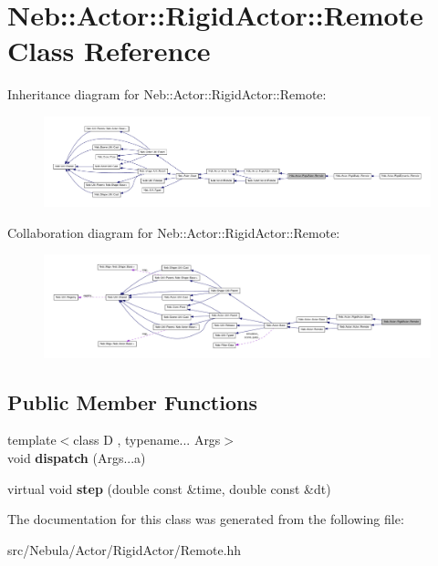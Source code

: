 \hypertarget{classNeb_1_1Actor_1_1RigidActor_1_1Remote}{\section{\-Neb\-:\-:\-Actor\-:\-:\-Rigid\-Actor\-:\-:\-Remote \-Class \-Reference}
\label{classNeb_1_1Actor_1_1RigidActor_1_1Remote}
}


\-Inheritance diagram for \-Neb\-:\-:\-Actor\-:\-:\-Rigid\-Actor\-:\-:\-Remote\-:\nopagebreak
\begin{figure}[H]
\begin{center}
\leavevmode
\includegraphics[width=350pt]{classNeb_1_1Actor_1_1RigidActor_1_1Remote__inherit__graph}
\end{center}
\end{figure}


\-Collaboration diagram for \-Neb\-:\-:\-Actor\-:\-:\-Rigid\-Actor\-:\-:\-Remote\-:\nopagebreak
\begin{figure}[H]
\begin{center}
\leavevmode
\includegraphics[width=350pt]{classNeb_1_1Actor_1_1RigidActor_1_1Remote__coll__graph}
\end{center}
\end{figure}
\subsection*{\-Public \-Member \-Functions}
\begin{DoxyCompactItemize}
\item 
\hypertarget{classNeb_1_1Actor_1_1RigidActor_1_1Remote_a2812d40eec201faec0a16b89bd4e64e3}{{\footnotesize template$<$class D , typename... \-Args$>$ }\\void {\bfseries dispatch} (\-Args...\-a)}\label{classNeb_1_1Actor_1_1RigidActor_1_1Remote_a2812d40eec201faec0a16b89bd4e64e3}

\item 
\hypertarget{classNeb_1_1Actor_1_1RigidActor_1_1Remote_a7812488a038c199e065710c1c718c27b}{virtual void {\bfseries step} (double const \&time, double const \&dt)}\label{classNeb_1_1Actor_1_1RigidActor_1_1Remote_a7812488a038c199e065710c1c718c27b}

\end{DoxyCompactItemize}


\-The documentation for this class was generated from the following file\-:\begin{DoxyCompactItemize}
\item 
src/\-Nebula/\-Actor/\-Rigid\-Actor/\-Remote.\-hh\end{DoxyCompactItemize}
